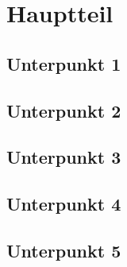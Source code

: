 \section{Hauptteil}
\label{sec:hauptteil}

\subsection{Unterpunkt 1}
\lipsum[23-24]

\subsection{Unterpunkt 2}
\lipsum[25]

\subsection{Unterpunkt 3}
\lipsum[26]

\subsection{Unterpunkt 4}
\lipsum[35]

\subsection{Unterpunkt 5}
\lipsum[46]
